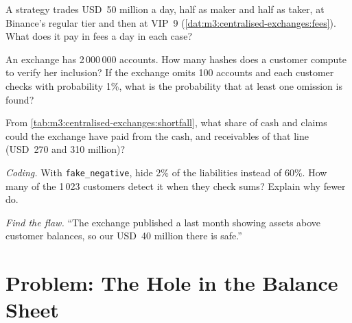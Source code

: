 \begin{exercise}[$\star\star$]\label{exo:m3:centralised-exchanges:4}
A strategy trades USD~50 million a day, half as maker and half as taker, at Binance's regular tier and then
at VIP~9 (\cref{dat:m3:centralised-exchanges:fees}). What does it pay in fees a day in each case?
\end{exercise}

\begin{exercise}[$\star\star$]\label{exo:m3:centralised-exchanges:5}
An exchange has 2\,000\,000 accounts. How many hashes does a customer compute to verify her inclusion? If
the exchange omits 100 accounts and each customer checks with probability 1\%, what is the probability that
at least one omission is found?
\end{exercise}

\begin{exercise}[$\star\star$]\label{exo:m3:centralised-exchanges:6}
From \cref{tab:m3:centralised-exchanges:shortfall}, what share of cash and  claims could the
exchange have paid from the cash,  and receivables of that line (USD~270 and 310 million)?
\end{exercise}

\begin{exercise}[$\star\star\star$]\label{exo:m3:centralised-exchanges:7}
\emph{Coding.} With \texttt{fake\_negative}, hide 2\% of the liabilities instead of 60\%. How many of the
1\,023 customers detect it when they check sums? Explain why fewer do.
\end{exercise}

\begin{exercise}[$\star\star\star$]\label{exo:m3:centralised-exchanges:8}
\emph{Find the flaw.} ``The exchange published a  last month showing assets above customer
balances, so our USD~40 million there is safe.''
\end{exercise}

\section{Problem: The Hole in the Balance Sheet}

